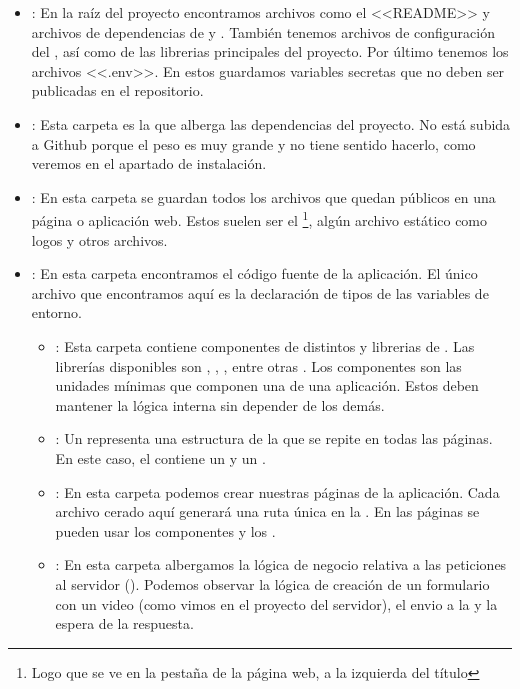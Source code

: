\begin{itemize}

  \item \prog{/}: En la raíz del proyecto encontramos archivos como el <<README>> y archivos de dependencias de  y . También tenemos archivos de configuración del , así como de las librerias principales del proyecto. Por último tenemos los archivos <<.env>>. En estos guardamos variables secretas que no deben ser publicadas en el repositorio.

  \item {}: Esta carpeta es la que alberga las dependencias del proyecto. No está subida a Github porque el peso es muy grande y no tiene sentido hacerlo, como veremos en el apartado de instalación.

  \item {}: En esta carpeta se guardan todos los archivos que quedan públicos en una página o aplicación web. Estos suelen ser el \footnote{Logo que se ve en la pestaña de la página web, a la izquierda del título}, algún archivo estático como logos y otros archivos.

  \item {}: En esta carpeta encontramos el código fuente de la aplicación. El único archivo que encontramos aquí es la declaración de tipos de las variables de entorno.
        \begin{itemize}
          \item {}: Esta carpeta contiene componentes de distintos  y librerias de . Las librerías disponibles son , , , entre otras . Los componentes son las unidades mínimas que componen una  de una aplicación. Estos deben mantener la lógica interna sin depender de los demás.

          \item {}: Un  representa una estructura de la  que se repite en todas las páginas. En este caso, el  contiene un  y un .

          \item {}: En esta carpeta podemos crear nuestras páginas de la aplicación. Cada archivo cerado aquí generará una ruta única en la . En las páginas se pueden usar los componentes y los .

          \item {}: En esta carpeta albergamos la lógica de negocio relativa a las peticiones  al servidor (). Podemos observar la lógica de creación de un formulario con un video (como vimos en el proyecto del servidor), el envio a la  y la espera de la respuesta.
        \end{itemize}

\end{itemize}

